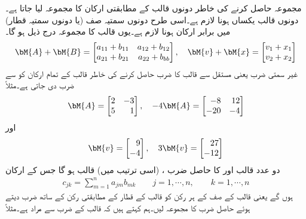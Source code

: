 مجموعہ حاصل کرنے کی خاطر دونوں قالب کے مطابقتی ارکان کا مجموعہ لیا جاتا ہے۔دونوں قالب یکساں  ہونا لازم ہے۔اسی طرح دونوں سمتیہ صف (یا دونوں سمتیہ قطار) میں برابر ارکان ہونا لازم ہے۔یوں  قالب کا مجموعہ درج ذیل ہو گا۔
\begin{align}
\bM{A}+\bM{B}=
\begin{bmatrix*}[r]
a_{11}+b_{11} & a_{12}+b_{12}\\
a_{21}+b_{21}& a_{22}+b_{bb}
\end{bmatrix*}, \quad \bM{v}+\bM{x}=
\begin{bmatrix*}[r]
v_1+x_1\\
v_2+x_2
\end{bmatrix*}
\end{align} 
 غیر سمتی ضرب یعنی مستقل   سے قالب کا ضرب حاصل کرنے کی خاطر قالب کے تمام ارکان کو  سے ضرب دی  جاتی ہے۔مثلاً 
\begin{align*}
\bM{A}=
\begin{bmatrix*}[r]
2& -3\\
5&1
\end{bmatrix*}, \quad 
-4\bM{A}=
\begin{bmatrix*}[r]
-8&12\\
-20&-4
\end{bmatrix*}
\end{align*}
اور
\begin{align*}
\bM{v}=
\begin{bmatrix*}[r]
9\\
-4
\end{bmatrix*}, \quad 
3\bM{v}=
\begin{bmatrix*}[r]
27\\
-12
\end{bmatrix*}
\end{align*}
دو عدد  قالب  اور   کا حاصل ضرب ، (اسی ترتیب میں)  قالب  ہو گا جس کے ارکان 
\begin{align}
c_{jk}=\sum_{m=1}^{n} a_{jm} b_{mk} \quad \quad j=1, \cdots, n, \quad\quad k=1,\cdots,n
\end{align}
ہوں گے یعنی  قالب کے  صف کے ہر رکن کو  قالب کے  قطار کے مطابقتی رکن کے ساتھ ضرب دیتے ہوئے  حاصل ضرب  کا مجموعہ لیں۔ہم کہتے ہیں کہ قالب کے ضرب سے مراد   ہے۔مثلاً
